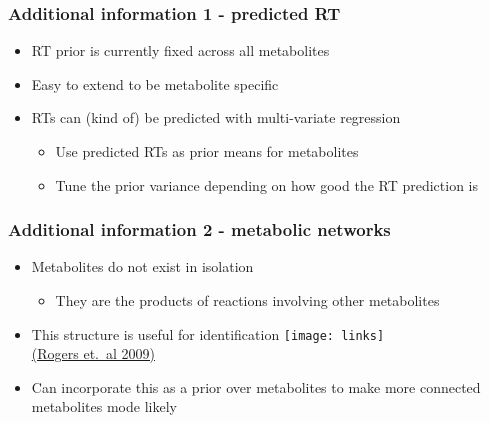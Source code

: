 \begin{frame}
	\frametitle{Additional information 1 - predicted RT}
	\begin{itemize}
		\item RT prior is currently fixed across all metabolites
		\item Easy to extend to be metabolite specific
		\item RTs can (kind of) be predicted with multi-variate regression
		\begin{itemize}
			\item Use predicted RTs as prior means for metabolites
			\item Tune the prior variance depending on how good the RT prediction is
		\end{itemize}
	\end{itemize}
\end{frame}

\begin{frame}
	\frametitle{Additional information 2 - metabolic networks}
	\begin{itemize}
		\item Metabolites do not exist in isolation
		\begin{itemize}
			\item They are the products of reactions involving other metabolites
		\end{itemize}
		\item<2-> This structure is useful for identification
		\texttt{[image: links]}\\
		\href{http://dx.doi.org/10.1093/bioinformatics/btn642}{(Rogers et.~al 2009)}
		\item<3->Can incorporate this as a prior over metabolites to make more connected metabolites mode likely
	\end{itemize}
\end{frame}

